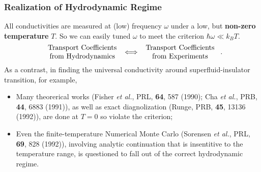 \documentclass[10pt,aspectratio=43,xcolor=x11names,t]{beamer}%
\begin{document}
		\begin{frame}\frametitle{Realization of Hydrodynamic Regime}
			All conductivities are measured at (low) frequency $\omega$ under a low, but \textbf{non-zero temperature} $T$. So we can easily tuned $\omega$ to meet the criterion $\hbar\omega\ll k_B T$.
			\begin{equation*}
				\parbox{4cm}{\centering Transport Coefficients from Hydrodynamics} \Longleftrightarrow \parbox{4cm}{\centering Transport Coefficients from Experiments}.
			\end{equation*}
			\pause
			As a contrast, in finding the universal conductivity around superfluid-insulator transition, for example,
			\begin{itemize}
				\item Many theorerical works ({\scriptsize Fisher \textit{et al.}, PRL, \textbf{64}, 587 (1990); Cha \textit{et al.}, PRB, \textbf{44}, 6883 (1991)}), as well as exact diagnolization ({\scriptsize Runge, PRB, \textbf{45}, 13136 (1992)}), are done at $T=0$ so violate the criterion; 
				\item Even the finite-temperature Numerical Monte Carlo ({\scriptsize Sorensen \textit{et al.}, PRL, \textbf{69}, 828 (1992)}), involving analytic continuation that is insentitive to the temperature range, is questioned to fall out of the correct hydrodynamic regime. 
			\end{itemize}
		\end{frame}
		
\end{document}
